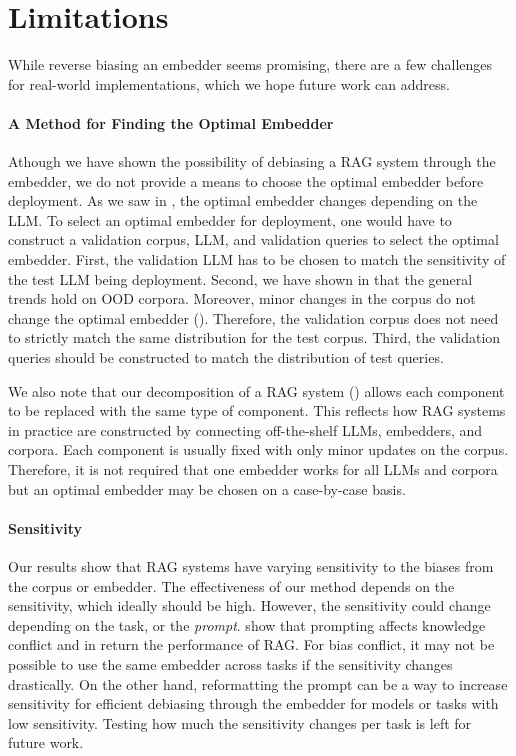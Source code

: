 \section{Limitations}
\label{limit}
While reverse biasing an embedder seems promising, there are a few challenges for real-world implementations, which we hope future work can address.

\paragraph{A Method for Finding the Optimal Embedder}
Athough we have shown the possibility of debiasing a RAG system through the embedder, we do not provide a means to choose the optimal embedder before deployment. As we saw in , the optimal embedder changes depending on the LLM. To select an optimal embedder for deployment, one would have to construct a validation corpus, LLM, and validation queries to select the optimal embedder. First, the validation LLM has to be chosen to match the sensitivity of the test LLM being deployment. Second, we have shown in  that the general trends hold on OOD corpora. Moreover, minor changes in the corpus do not change the optimal embedder (). Therefore, the validation corpus does not need to strictly match the same distribution for the test corpus. Third, the validation queries should be constructed to match the distribution of test queries.

We also note that our decomposition of a RAG system () allows each component to be replaced with the same type of component. This reflects how RAG systems in practice are constructed by connecting off-the-shelf LLMs, embedders, and corpora. Each component is usually fixed with only minor updates on the corpus. Therefore, it is not required that one embedder works for all LLMs and corpora but an optimal embedder may be chosen on a case-by-case basis. 

\paragraph{Sensitivity}
Our results show that RAG systems have varying sensitivity to the biases from the corpus or embedder. The effectiveness of our method depends on the sensitivity, which ideally should be high.
However, the sensitivity could change depending on the task, or the \emph{prompt}. \citep{liu2024untangle, zhou2023context, lazaridou2022internet} show that prompting affects knowledge conflict and in return the performance of RAG. For bias conflict, it may not be possible to use the same embedder across tasks if the sensitivity changes drastically. On the other hand, reformatting the prompt can be a way to increase sensitivity for efficient debiasing through the embedder for models or tasks with low sensitivity. Testing how much the sensitivity changes per task is left for future work.

